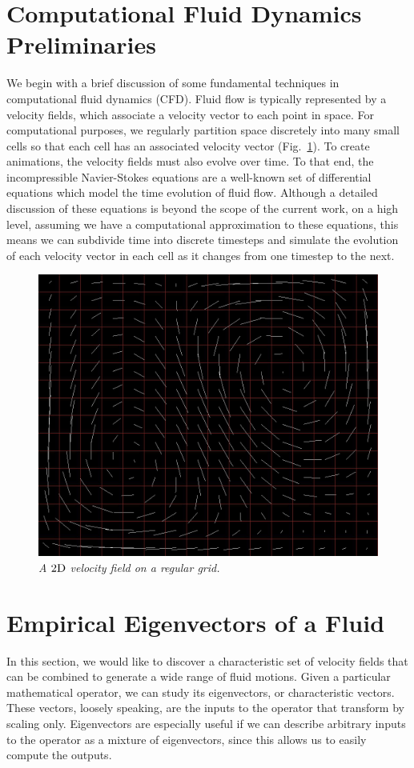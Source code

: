 \documentclass[11pt]{article}
\begin{document}
\section*{Computational Fluid Dynamics Preliminaries}
We begin with a brief discussion of some fundamental techniques in computational fluid dynamics (CFD). Fluid flow is typically represented by a velocity fields, which associate a velocity vector to each point in space. For computational purposes, we regularly partition space discretely into many small cells so that each cell has an associated velocity vector (Fig.~\ref{fig:velocity-field}). To create animations, the velocity fields must also evolve over time. To that end, the incompressible Navier-Stokes equations are a well-known set of differential equations which model the time evolution of fluid flow. Although a detailed discussion of these equations is beyond the scope of the current work, on a high level, assuming we have a computational approximation to these equations, this means we can subdivide time into discrete timesteps and simulate the evolution of each velocity vector in each cell as it changes from one timestep to the next. 

\begin{figure}
		\centering
		\includegraphics[height=0.5\textwidth]{Figures/velocity_field.png}
		\caption{\em A $2\textnormal{D}$ velocity field on a regular grid.}
		\label{fig:velocity-field}
\end{figure}

\section*{Empirical Eigenvectors of a Fluid}
In this section, we would like to discover a characteristic set of velocity fields that can be combined to generate a wide range of fluid motions. Given a particular mathematical operator, we can study its eigenvectors, or characteristic vectors. These vectors, loosely speaking, are the inputs to the operator that transform by scaling only. Eigenvectors are especially useful if we can describe arbitrary inputs to the operator as a mixture of eigenvectors, since this allows us to easily compute the outputs.
\end{document}
